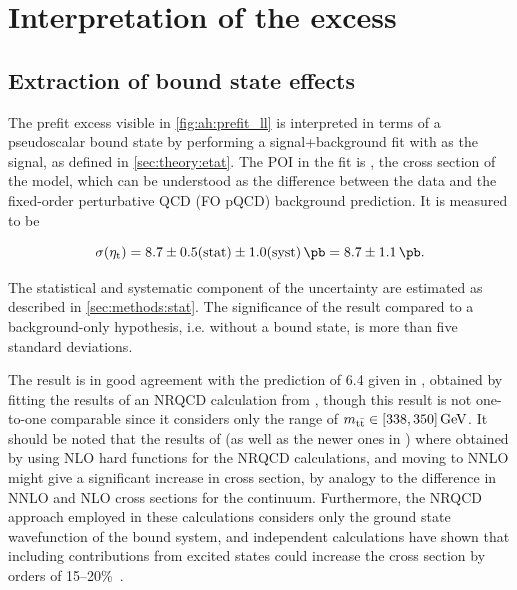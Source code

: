 
\section{Interpretation of the excess}
\label{sec:ah:excess}

\subsection{Extraction of \ttbartitle bound state effects}
\label{sec:ah:etat}

The prefit excess visible in \cref{fig:ah:prefit_ll} is interpreted in terms of a pseudoscalar \ttbar bound state by performing a signal+background fit with \etat as the signal, as defined in \cref{sec:theory:etat}. The POI in the fit is \sigetat, the cross section of the \etat model, which can be understood as the difference between the data and the fixed-order perturbative QCD (FO pQCD) background prediction. It is measured to be

\begin{equation}
    \sigetat = 8.7 \pm 0.5 (\text{stat}) \pm 1.0 (\text{syst}) \, \si{\pb} = 8.7 \pm 1.1  \, \si{\pb}.
\end{equation}

The statistical and systematic component of the uncertainty are estimated as described in \cref{sec:methods:stat}. The significance of the result compared to a background-only hypothesis, i.e. without a bound state, is more than five standard deviations.

The result is in good agreement with the prediction of \SI{6.4}{\pb} given in , obtained by fitting the results of an NRQCD calculation from , though this result is not one-to-one comparable since it considers only the range of $\mtt \in [338, 350] \, \si{\GeV}$. It should be noted that the results of  (as well as the newer ones in )  where obtained by using NLO hard functions for the NRQCD calculations, and moving to NNLO might give a significant increase in cross section, by analogy to the difference in NNLO and NLO cross sections for the \ttbar continuum. Furthermore, the NRQCD approach employed in these calculations considers only the ground state wavefunction of the bound \ttbar system, and independent calculations have shown that including contributions from excited states could increase the cross section by orders of 15--20\%~\cite{Llanes-Estrada:2024phk,dEnterria:2025ecx}.

